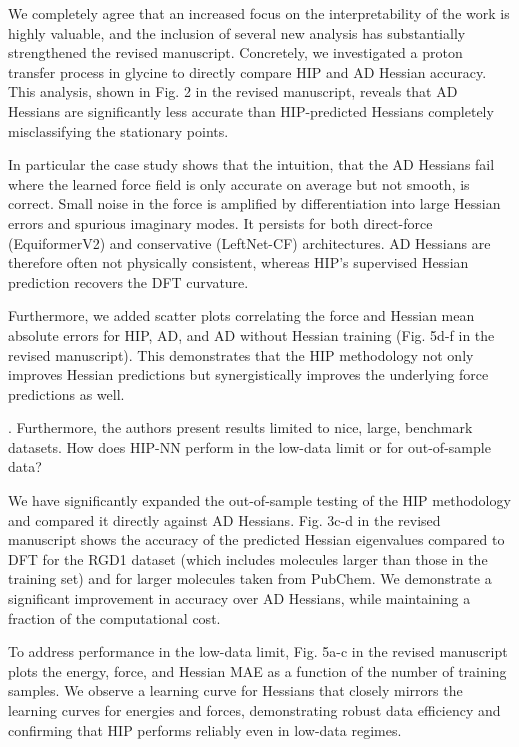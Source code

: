 \documentclass[pdflatex,sn-mathphys-num]{sn-jnl}
\begin{document}
\vspace{2mm}
{\color{mycustomcolour}
\noindent 
We completely agree that an increased focus on the interpretability of the work is highly valuable, and the inclusion of several new analysis has substantially strengthened the revised manuscript. Concretely, we investigated a proton transfer process in glycine to directly compare HIP and AD Hessian accuracy. This analysis, shown in Fig. 2 in the revised manuscript, reveals that AD Hessians are significantly less accurate than HIP-predicted Hessians completely misclassifying the stationary points. 

In particular the case study shows that the intuition, that the AD Hessians fail where the learned force field is only accurate on average but not smooth, is correct. 
Small noise in the force is amplified by differentiation into large Hessian errors and spurious imaginary modes.
It persists for both direct-force (EquiformerV2) and conservative (LeftNet-CF) architectures. AD Hessians are therefore often not physically consistent, whereas HIP’s supervised Hessian prediction recovers the DFT curvature.

Furthermore, we added scatter plots correlating the force and Hessian mean absolute errors for HIP, AD, and AD without Hessian training (Fig. 5d-f in the revised manuscript). This demonstrates that the HIP methodology not only improves Hessian predictions but synergistically improves the underlying force predictions as well.

}
\vspace{2mm}

. Furthermore, the authors present results limited to nice, large, benchmark datasets. How does HIP-NN perform in the low-data limit or for out-of-sample data?

{\color{mycustomcolour}
\noindent We have significantly expanded the out-of-sample testing of the HIP methodology and compared it directly against AD Hessians. Fig. 3c-d in the revised manuscript shows the accuracy of the predicted Hessian eigenvalues compared to DFT for the RGD1 dataset (which includes molecules larger than those in the training set) and for larger molecules taken from PubChem. We demonstrate a significant improvement in accuracy over AD Hessians, while maintaining a fraction of the computational cost.

To address performance in the low-data limit, Fig. 5a-c in the revised manuscript plots the energy, force, and Hessian MAE as a function of the number of training samples. We observe a learning curve for Hessians that closely mirrors the learning curves for energies and forces, demonstrating robust data efficiency and confirming that HIP performs reliably even in low-data regimes.

}
\vspace{2mm}
\end{document}
